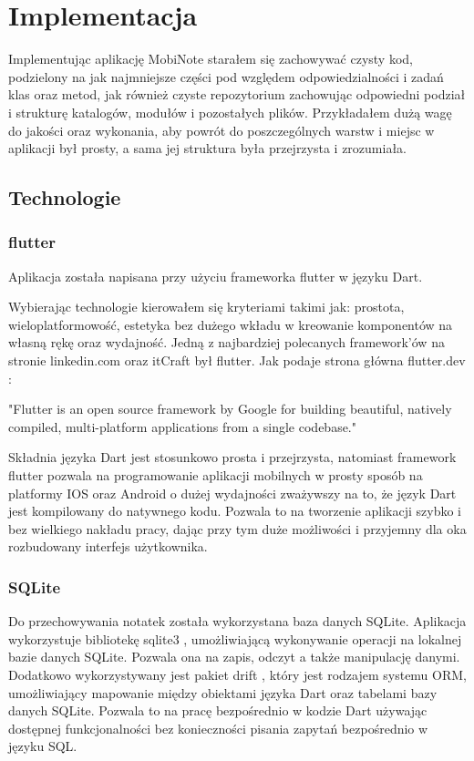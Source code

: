 \chapter{Implementacja}
    
Implementując aplikację MobiNote starałem się zachowywać czysty kod, podzielony na jak najmniejsze części pod względem odpowiedzialności i zadań klas oraz metod, jak również czyste repozytorium zachowując odpowiedni podział i strukturę katalogów, modułów i pozostałych plików. Przykładałem dużą wagę do jakości oraz wykonania, aby powrót do poszczególnych warstw i miejsc w aplikacji był prosty, a sama jej struktura była przejrzysta i zrozumiała. 

\section{Technologie}

\subsection{flutter}

Aplikacja została napisana przy użyciu frameworka flutter w języku Dart.

Wybierając technologie kierowałem się kryteriami takimi jak: prostota, wieloplatformowość, estetyka bez dużego wkładu w kreowanie komponentów na własną rękę oraz wydajność. Jedną z najbardziej polecanych framework'ów na stronie  linkedin.com \cite{linkedin} oraz itCraft \cite{itCraft} był flutter. Jak podaje strona główna flutter.dev \cite{flutter}:

"Flutter is an open source framework by Google for building beautiful, natively compiled, multi-platform applications from a single codebase."

Składnia języka Dart jest stosunkowo prosta i przejrzysta, natomiast framework flutter pozwala na programowanie aplikacji mobilnych w prosty sposób na platformy IOS oraz Android o dużej wydajności zważywszy na to, że język Dart jest kompilowany do natywnego kodu. Pozwala to na tworzenie aplikacji szybko i bez wielkiego nakładu pracy, dając przy tym duże możliwości i przyjemny dla oka rozbudowany interfejs użytkownika.

\subsection{SQLite}

Do przechowywania notatek została wykorzystana baza danych SQLite. Aplikacja wykorzystuje bibliotekę sqlite3 \cite{sqlite3}, umożliwiającą wykonywanie operacji na lokalnej bazie danych SQLite. Pozwala ona na zapis, odczyt a także manipulację danymi. Dodatkowo wykorzystywany jest pakiet drift \cite{drift}, który jest rodzajem systemu ORM, umożliwiający mapowanie między obiektami języka Dart oraz tabelami bazy danych SQLite. Pozwala to na pracę bezpośrednio w kodzie Dart używając dostępnej funkcjonalności bez konieczności pisania zapytań bezpośrednio w języku SQL.

